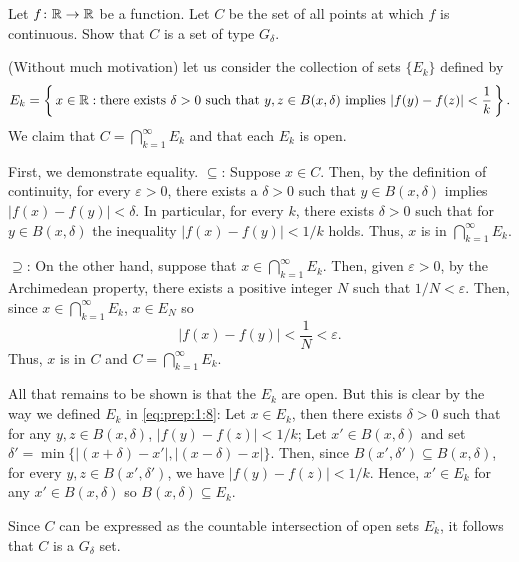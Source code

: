 \begin{problem}
  Let $f\colon\mathbb{R}\to\mathbb{R}$ be a function. Let $C$ be the set of all points
  at which $f$ is continuous. Show that $C$ is a set of type $G_\delta$.
\end{problem}
\begin{solution}
  (Without much motivation) let us consider the collection of sets
  $\{E_k\}$ defined by
  \begin{equation}
    \label{eq:prep:1:8}
    E_k=\left\{\,x\in\mathbb{R}:
      \text{there exists $\delta>0$ such that $y,z\in B(x,\delta)$ implies $\left|f(y)-f(z)\right|<\frac{1}{k}$}\,\right\}.
  \end{equation}
  We claim that $C=\bigcap_{k=1}^\infty E_k$ and that each $E_k$ is open.
  \begin{solution}
    First, we demonstrate equality. $\subseteq$: Suppose $x\in C$. Then, by
    the definition of continuity, for every $\varepsilon>0$, there exists a
    $\delta>0$ such that $y\in B(x,\delta)$ implies
    $|f(x)-f(y)|<\delta$. In particular, for every $k$, there exists
    $\delta>0$ such that for $y\in B(x,\delta)$ the inequality
    $|f(x)-f(y)|<1/k$ holds. Thus, $x$ is in $\bigcap_{k=1}^\infty E_k$.

    $\supseteq$: On the other hand, suppose that
    $x\in\bigcap_{k=1}^\infty E_k$. Then, given $\varepsilon>0$, by the
    Archimedean property, there exists a positive integer $N$ such that
    $1/N<\varepsilon$. Then, since $x\in\bigcap_{k=1}^\infty E_k$,
    $x\in E_N$ so
    \begin{equation}
      \label{eq:prep:1:9}
      |f(x)-f(y)|<\frac{1}{N}<\varepsilon.
    \end{equation}
    Thus, $x$ is in $C$ and $C=\bigcap_{k=1}^\infty E_k$.

    All that remains to be shown is that the $E_k$ are open. But this is
    clear by the way we defined $E_k$ in \eqref{eq:prep:1:8}: Let
    $x\in E_k$, then there exists $\delta>0$ such that for any
    $y,z\in B(x,\delta)$, $|f(y)-f(z)|<1/k$; Let $x'\in B(x,\delta)$ and
    set $\delta'=\min\{|(x+\delta)-x'|,|(x-\delta)-x|\}$. Then, since
    $B(x',\delta')\subseteq B(x,\delta)$, for every $y,z\in B(x',\delta')$,
    we have $|f(y)-f(z)|<1/k$. Hence, $x'\in E_k$ for any
    $x'\in B(x,\delta)$ so $B(x,\delta)\subseteq E_k$.
  \end{solution}
  Since $C$ can be expressed as the countable intersection of open sets
  $E_k$, it follows that $C$ is a $G_\delta$ set.
\end{solution}
